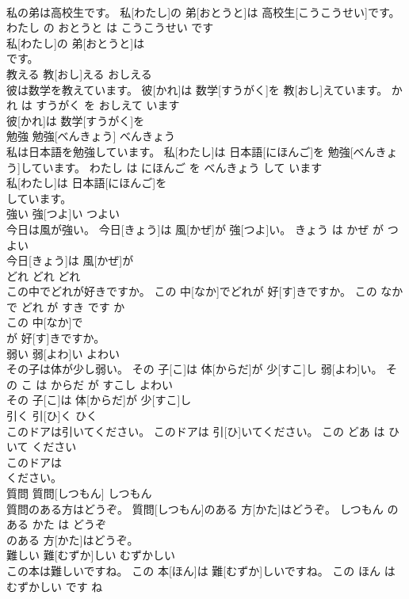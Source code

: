 \documentclass[8pt]{extreport}
\begin{document}
\begin{CJK}{UTF8}{min}
\\	私の弟は高校生です。	私[わたし]の 弟[おとうと]は 高校生[こうこうせい]です。	わたし の おとうと は こうこうせい です	
\\	私[わたし]の 弟[おとうと]は
\\	です。			
\\	教える	教[おし]える	おしえる	
\\	彼は数学を教えています。	彼[かれ]は 数学[すうがく]を 教[おし]えています。	かれ は すうがく を おしえて います	
\\	彼[かれ]は 数学[すうがく]を
\\	勉強	勉強[べんきょう]	べんきょう	
\\	私は日本語を勉強しています。	私[わたし]は 日本語[にほんご]を 勉強[べんきょう]しています。	わたし は にほんご を べんきょう して います	
\\	私[わたし]は 日本語[にほんご]を
\\	しています。			
\\	強い	強[つよ]い	つよい	
\\	今日は風が強い。	今日[きょう]は 風[かぜ]が 強[つよ]い。	きょう は かぜ が つよい	
\\	今日[きょう]は 風[かぜ]が
\\	どれ	どれ	どれ	
\\	この中でどれが好きですか。	この 中[なか]でどれが 好[す]きですか。	この なか で どれ が すき です か	
\\	この 中[なか]で
\\	が 好[す]きですか。			
\\	弱い	弱[よわ]い	よわい	
\\	その子は体が少し弱い。	その 子[こ]は 体[からだ]が 少[すこ]し 弱[よわ]い。	その こ は からだ が すこし よわい	
\\	その 子[こ]は 体[からだ]が 少[すこ]し
\\	引く	引[ひ]く	ひく	
\\	このドアは引いてください。	このドアは 引[ひ]いてください。	この どあ は ひいて ください	
\\	このドアは
\\	ください。			
\\	質問	質問[しつもん]	しつもん	
\\	質問のある方はどうぞ。	質問[しつもん]のある 方[かた]はどうぞ。	しつもん の ある かた は どうぞ	
\\	のある 方[かた]はどうぞ。			
\\	難しい	難[むずか]しい	むずかしい	
\\	この本は難しいですね。	この 本[ほん]は 難[むずか]しいですね。	この ほん は むずかしい です ね	

\end{CJK}
\end{document}
